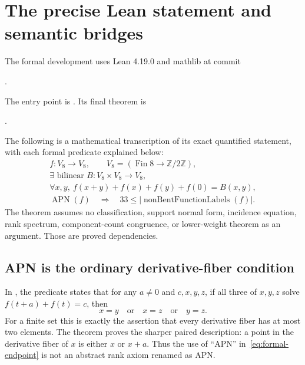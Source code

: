 \section{The precise Lean statement and semantic bridges}\label{app:lean}
The formal development uses Lean 4.19.0 and mathlib at commit
\begin{center}
.
\end{center}
The entry point is . Its final theorem is
\begin{center}
.
\end{center}
The following is a mathematical transcription of its exact quantified statement, with each formal predicate explained below:
\begin{equation}\label{eq:formal-endpoint}
\begin{gathered}
f\colon V_8\to V_8,\qquad V_8=(\operatorname{Fin}8\to\mathbb Z/2\mathbb Z),\\
\exists\text{ bilinear }B\colon V_8\times V_8\to V_8,\\
\forall x,y,\ f(x+y)+f(x)+f(y)+f(0)=B(x,y),\\
\operatorname{APN}(f)
\quad\Longrightarrow\quad
33\le\bigl|\operatorname{nonBentFunctionLabels}(f)\bigr|.
\end{gathered}
\end{equation}
The theorem assumes no classification, support normal form, incidence equation, rank spectrum, component-count congruence, or lower-weight theorem as an argument. Those are proved dependencies.

\subsection{APN is the ordinary derivative-fiber condition}
In , the predicate  states that for any $a\ne0$ and $c,x,y,z$, if all three of $x,y,z$ solve $f(t+a)+f(t)=c$, then
\[
x=y\quad\text{or}\quad x=z\quad\text{or}\quad y=z.
\]
For a finite set this is exactly the assertion that every derivative fiber has at most two elements. The theorem  proves the sharper paired description: a point in the derivative fiber of $x$ is either $x$ or $x+a$. Thus the use of ``APN'' in~\eqref{eq:formal-endpoint} is not an abstract rank axiom renamed as APN.

